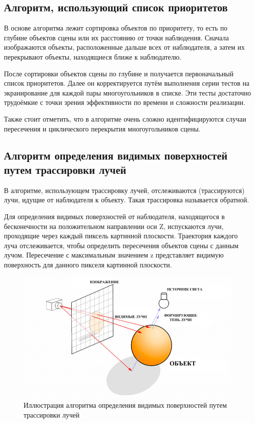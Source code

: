 \subsection{Алгоритм, использующий список приоритетов}
В основе алгоритма лежит сортировка объектов по приоритету, то есть по глубине объектов сцены или их расстоянию от точки наблюдения. Сначала изображаются объекты, расположенные дальше всех от наблюдателя, а затем их перекрывают объекты, находящиеся ближе к наблюдателю.

После сортировки объектов сцены по глубине и получается первоначальный список приоритетов. Далее он корректируется путём выполнения серии тестов на экранирование для каждой пары многоугольников в списке. Эти тесты достаточно трудоёмкие с точки зрения эффективности по времени и сложности реализации.

Также стоит отметить, что в алгоритме очень сложно идентифицируются случаи пересечения и циклического перекрытия многоугольников сцены.

\subsection{Алгоритм определения видимых поверхностей путем трассировки лучей}
В алгоритме, использующем трассировку лучей, отслеживаются (трассируются) лучи, идущие от наблюдателя к объекту. Такая трассировка называется обратной.

Для определения видимых поверхностей от наблюдателя, находящегося в бесконечности на положительном направлении оси Z, испускаются лучи, проходящие через каждый пиксель картинной плоскости. Траектория каждого луча отслеживается, чтобы определить пересечения объектов сцены с данным лучом. Пересечение с максимальным значением z представляет видимую поверхность для данного пикселя картинной плоскости.

\begin{figure}[h]
	\centering
	\includegraphics[width=\textwidth ]{img/raytracing.png}
	\caption{Иллюстрация алгоритма определения видимых поверхностей путем трассировки лучей}
\end{figure} 


